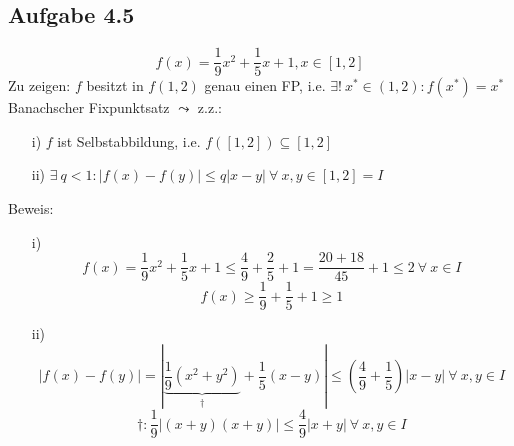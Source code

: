 \documentclass[
    accentcolor=pink,
    boxarc,
    dark_mode,
    logofile=enmpty
]{rubos-tuda-template}
\begin{document}
    \subsection*{Aufgabe 4.5}
    \[f(x) = \frac{1}{9}x^2 + \frac{1}{5}x + 1, x \in [1, 2]\]
    Zu zeigen: $f$ besitzt in $f(1,2)$ genau einen FP, i.e. $\exists!\ x^* \in (1,2):f(x^*) = x^*$\\
    Banachscher Fixpunktsatz $\leadsto$ z.z.:
    \begin{enumerate}
        \item[i)]
            $f$ ist Selbstabbildung, i.e. $f([1,2]) \subseteq [1,2]$

        \item[ii)] $\exists\ q < 1 : |f(x)-f(y)| \le q|x-y|\ \forall\ x,y \in [1,2] = I$
    \end{enumerate}
    Beweis:
    \begin{enumerate}
        \item[i)]
            \[f(x) = \frac{1}{9}x^2 + \frac{1}{5}x + 1 \le \frac{4}{9} + \frac{2}{5} + 1 = \frac{20+18}{45} + 1 \le 2\ \forall\ x \in I\]
            \[f(x) \ge \frac{1}{9} + \frac{1}{5} + 1 \ge 1\]

        \item[ii)]
            \[|f(x) - f(y)| = |\underbrace{\frac{1}{9}(x^2+y^2)}_{\dagger}+\frac{1}{5}(x-y)| \le (\frac{4}{9} + \frac{1}{5})|x-y|\ \forall\ x,y \in I\]
            \[\dagger: \frac{1}{9}|(x+y)(x+y)| \le \frac{4}{9} |x+y|\ \forall\ x,y \in I\]

    \end{enumerate}
\end{document}
